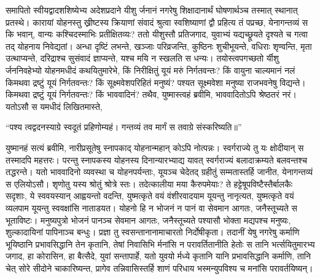 \adhyAya
\vspace{25pt}
\vakya समापितो स्वीयद्वादशशिष्येभ्य अदेशप्रदाने यीशु र्जनानं नगरेषु शिक्षादानार्थं घोषणार्थञ्च तस्मात् स्थानात् प्रतस्थे।
\vakya कारायां योहनस्तु ख्रीष्टस्य क्रियाणां संवादं श्रुत्वा स्वशिष्याणां द्वौ प्रहित्य तं पप्रच्छ,
\vakya येनागन्तव्यं स कि भवान्, वान्यः कश्चिदस्माभिः प्रतीक्षितव्यः?
\vakya ततो यीशुस्तौ प्रतिजगाद, युवाभ्यं यद्यच्छ्रूयते दृश्यते च गत्वा तद् योहनाय निवेद्यतां।
\vakya अन्धा दृष्टिं लभन्ते, खञ्जाः परिव्रजन्ति, कुष्ठिनः शुचीभूयन्ते, वधिराः शृण्वन्ति, मृता उत्थाप्यन्ते, दरिद्राश्च सुसंवादं ज्ञाप्यन्ते,
\vakya यश्च मयि न स्खलति स धन्यः।
\vakya तयोस्त्वपगच्छतो र्यीशु र्जननिवहेभ्यो योहनमधीदं कथयितुमारेभे, किं निरीक्षितुं यूयं मरुं निर्गतवन्तः? किं वायुना चाल्यमानं नलं किमथवा द्रष्टुं यूयं निर्गतवन्तः?
\vakya किं सूक्ष्मवेशपरिहितं मनुष्यं? पश्यत सूक्ष्मवेशा मनुष्या राजभवनेषु विद्यन्ते।
\vakya किमथवा द्रष्टुं यूयं निर्गतवन्तः? किं भाववादिनं? तथैव, युष्मास्त्वहं ब्रवीमि, भाववादितोऽपि श्रेष्ठतरं नरं।
\vakya यतोऽसौ स यमधीदं लिखितमास्ते,
\begin{poem}
\startwithline “पश्य त्वद्वदनस्याग्रे स्वदूतं प्रहिणोम्यहं।
\pline गन्तव्यं तव मार्गं स तवाग्रे संस्करिष्यति॥”
\end{poem}
\vakya युष्मानहं सत्यं ब्रवीमि, नारीप्रसूतेषु स्नापकाद् योहनान्महान् कोऽपि नोत्पन्नः। स्वर्गराज्ये तु यः क्षोदीयान् स तस्मादपि महत्तरः।
\vakya परन्तु स्नापकस्य योहनस्य दिनान्यारभ्याद्य यावत् स्वर्गराज्यं बलादाक्रम्यते बलवन्तश्च तद्धरन्ते।
\vakya यतो भाववादिनो व्यवस्था च योहनपर्यन्ताः,
\vakya यूयञ्च चेदेतद् ग्रहीतुं सम्मतास्तर्हि जानीत, येनागन्तव्यं स एलियोऽसौ।
\vakya शृणोतु यस्य श्रोतुं श्रोत्रे स्तः।
\vakya तदेत्कालीया मया कैरुपमेयाः? ते हट्टेषूपविष्टैस्तैर्बालकैः सदृशाः,
\vakya ये स्ववयस्यान् आह्वयन्तो वदन्ति, युष्मत्कृते वयं वंशीरवादयाम यूयन्तु नानृत्यत, युष्मत्कृते वयं व्यलपाम यूयन्तु स्ववक्षांसि नाताडयत।
\vakya योहनो हि न भोजनं न पानं वा सेवमान आगतः, जनैस्तूच्यते स भूताविष्टः।
\vakya मनुष्यपुत्रो भोजनं पानञ्च सेवमान आगतः, जनैस्तूच्यते पश्यासौ भोक्ता मद्यपश्च मनुष्यः, शुल्कादायिनां पापिनाञ्च बन्धुः। प्रज्ञा तु स्वसन्तानानामाचारतो निर्दोषीकृता।
\vakya तदानीं येषु नगरेषु कर्माणि भूयिष्ठानि प्रभावसिद्धानि तेन कृतानि, तेषां निवासिभि र्मनांसि न परावर्तितानीति हेतोः स तानि भर्त्सयितुमारभ्य जगाद, 
\vakya हा कोरासिन, हा बैत्सैदे, युवां सन्तापार्हे, यतो युवयो र्मध्ये कृतानि यानि प्रभावसिद्धानि कर्माणि, तानि चेत् सोरे सीदोने चाकारिष्यन्त, प्रागेव तन्निवासिस्तर्हि शाणं परिधाय भस्मन्युपविश्य च मनांसि परावर्तयिष्यन्।
